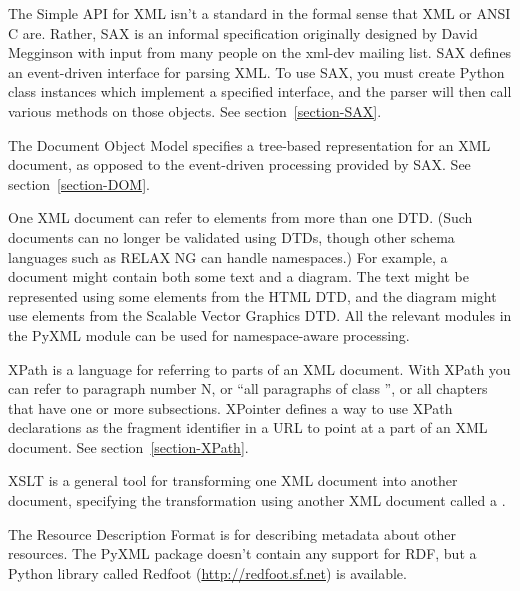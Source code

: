 \documentclass{howto}
\begin{document}
\begin{definitions}

  The Simple API for XML isn't a standard in the formal sense that XML
  or ANSI C are.  Rather, SAX is an informal specification originally
  designed by David Megginson with input from many people on the
  xml-dev mailing list.  SAX defines an event-driven interface for
  parsing XML.  To use SAX, you must create Python class instances
  which implement a specified interface, and the parser will then call
  various methods on those objects.  See section~\ref{section-SAX}.

  The Document Object Model specifies a tree-based representation for
  an XML document, as opposed to the event-driven processing provided
  by SAX.  See section~\ref{section-DOM}.

  One XML document can refer to elements
  from more than one DTD.  (Such documents can no longer be validated
  using DTDs, though other schema languages such as RELAX NG can
  handle namespaces.) For example, a document might contain both some
  text and a diagram.  The text might be represented using some
  elements from the HTML DTD, and the diagram might use elements from
  the Scalable Vector Graphics DTD.  All the relevant modules in the
  PyXML module can be used for namespace-aware processing.

  XPath is a language for referring to parts of an XML document.  With
  XPath you can refer to paragraph number N, or ``all paragraphs of
  class '', or all chapters that have one or more
  subsections.
  XPointer defines a way to use XPath declarations as the fragment
  identifier in a URL to point at a part of an XML document.
  See section~\ref{section-XPath}.

  XSLT is a general tool for transforming one XML document
  into another document, specifying the transformation using 
  another XML document called a .
  \begin{comment}
  See section~\ref{section-XSLT}.
  \end{comment}

  The Resource Description Format is for describing metadata about 
  other resources.  The PyXML package doesn't contain any support
  for RDF, but a Python library called Redfoot
  (\url{http://redfoot.sf.net}) is available.

\end{definitions}
\end{document}
